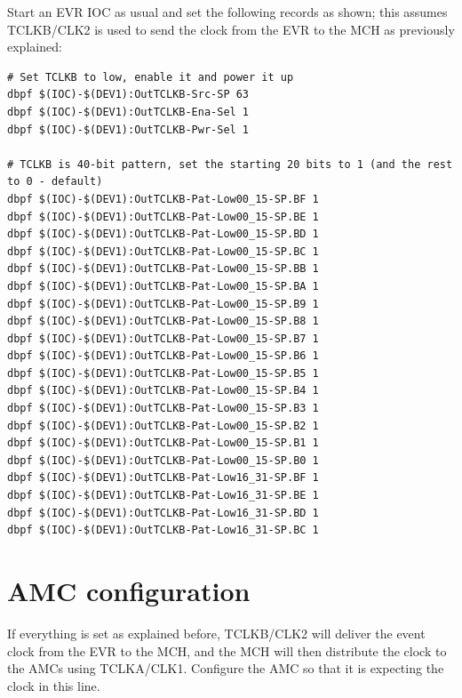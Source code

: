 \documentclass[11pt
  , a4paper
  , article
  , oneside
  , showtrims
]{memoir}
\begin{document}
Start an EVR IOC as usual and set the following records as shown; this assumes TCLKB/CLK2 is used to send the clock from the EVR to the MCH as previously explained:
\begin{lstlisting}[style=termstyle]
# Set TCLKB to low, enable it and power it up
dbpf $(IOC)-$(DEV1):OutTCLKB-Src-SP 63
dbpf $(IOC)-$(DEV1):OutTCLKB-Ena-Sel 1
dbpf $(IOC)-$(DEV1):OutTCLKB-Pwr-Sel 1

# TCLKB is 40-bit pattern, set the starting 20 bits to 1 (and the rest to 0 - default)
dbpf $(IOC)-$(DEV1):OutTCLKB-Pat-Low00_15-SP.BF 1
dbpf $(IOC)-$(DEV1):OutTCLKB-Pat-Low00_15-SP.BE 1
dbpf $(IOC)-$(DEV1):OutTCLKB-Pat-Low00_15-SP.BD 1
dbpf $(IOC)-$(DEV1):OutTCLKB-Pat-Low00_15-SP.BC 1
dbpf $(IOC)-$(DEV1):OutTCLKB-Pat-Low00_15-SP.BB 1
dbpf $(IOC)-$(DEV1):OutTCLKB-Pat-Low00_15-SP.BA 1
dbpf $(IOC)-$(DEV1):OutTCLKB-Pat-Low00_15-SP.B9 1
dbpf $(IOC)-$(DEV1):OutTCLKB-Pat-Low00_15-SP.B8 1
dbpf $(IOC)-$(DEV1):OutTCLKB-Pat-Low00_15-SP.B7 1
dbpf $(IOC)-$(DEV1):OutTCLKB-Pat-Low00_15-SP.B6 1
dbpf $(IOC)-$(DEV1):OutTCLKB-Pat-Low00_15-SP.B5 1
dbpf $(IOC)-$(DEV1):OutTCLKB-Pat-Low00_15-SP.B4 1
dbpf $(IOC)-$(DEV1):OutTCLKB-Pat-Low00_15-SP.B3 1
dbpf $(IOC)-$(DEV1):OutTCLKB-Pat-Low00_15-SP.B2 1
dbpf $(IOC)-$(DEV1):OutTCLKB-Pat-Low00_15-SP.B1 1
dbpf $(IOC)-$(DEV1):OutTCLKB-Pat-Low00_15-SP.B0 1
dbpf $(IOC)-$(DEV1):OutTCLKB-Pat-Low16_31-SP.BF 1
dbpf $(IOC)-$(DEV1):OutTCLKB-Pat-Low16_31-SP.BE 1
dbpf $(IOC)-$(DEV1):OutTCLKB-Pat-Low16_31-SP.BD 1
dbpf $(IOC)-$(DEV1):OutTCLKB-Pat-Low16_31-SP.BC 1
\end{lstlisting}



\section{AMC configuration}
If everything is set as explained before, TCLKB/CLK2 will deliver the event clock from the EVR to the MCH, and the MCH will then distribute the clock to the AMCs using TCLKA/CLK1. Configure the AMC so that it is expecting the clock in this line.


\clearpage

\backmatter
%
%
%

%
%

\end{document}

